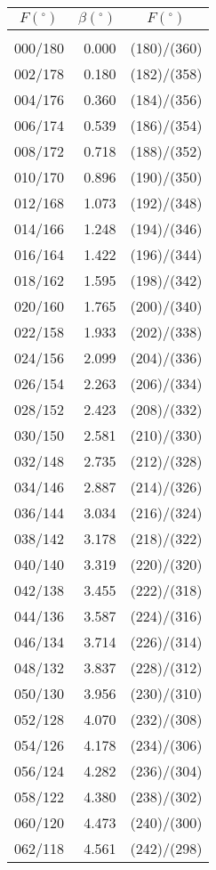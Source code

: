 \newpage
\begin{table}\centering
\small{ \begin{tabular}{crc}
$F (^\circ)$ & $\beta(^\circ)$ &
$F (^\circ)$ \\\hline
&&\\[-1.75ex]
000/180 &  0.000 & (180)/(360)\\
002/178 &  0.180 & (182)/(358)\\
004/176 &  0.360 & (184)/(356)\\
006/174 &  0.539 & (186)/(354)\\
008/172 &  0.718 & (188)/(352)\\
010/170 &  0.896 & (190)/(350)\\
012/168 &  1.073 & (192)/(348)\\
014/166 &  1.248 & (194)/(346)\\
016/164 &  1.422 & (196)/(344)\\
018/162 &  1.595 & (198)/(342)\\
020/160 &  1.765 & (200)/(340)\\
022/158 &  1.933 & (202)/(338)\\
024/156 &  2.099 & (204)/(336)\\
026/154 &  2.263 & (206)/(334)\\
028/152 &  2.423 & (208)/(332)\\
030/150 &  2.581 & (210)/(330)\\
032/148 &  2.735 & (212)/(328)\\
034/146 &  2.887 & (214)/(326)\\
036/144 &  3.034 & (216)/(324)\\
038/142 &  3.178 & (218)/(322)\\
040/140 &  3.319 & (220)/(320)\\
042/138 &  3.455 & (222)/(318)\\
044/136 &  3.587 & (224)/(316)\\
046/134 &  3.714 & (226)/(314)\\
048/132 &  3.837 & (228)/(312)\\
050/130 &  3.956 & (230)/(310)\\
052/128 &  4.070 & (232)/(308)\\
054/126 &  4.178 & (234)/(306)\\
056/124 &  4.282 & (236)/(304)\\
058/122 &  4.380 & (238)/(302)\\
060/120 &  4.473 & (240)/(300)\\
062/118 &  4.561 & (242)/(298)\\

\end{tabular}}
\end{table}
